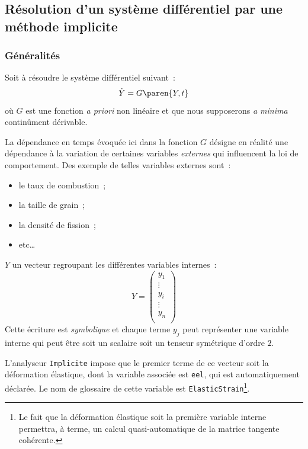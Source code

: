 \documentclass[rectoverso,pleiades,pstricks,leqno,anti]{texmf/note_technique_2010}
\begin{document}
\subsection{Résolution d'un système différentiel par une méthode implicite}
\label{sec:resol-dun-syst-implicite}

\subsubsection{Généralités} Soit à résoudre le système différentiel
suivant~:
\begin{equation}
  \label{eq:systeme_diff-implicite}
  \dot{Y}=G\paren{Y,t}
\end{equation}
où \(G\) est une fonction {\em a priori} non linéaire et que nous
supposerons {\em a minima} continûment dérivable.

La dépendance en temps évoquée ici dans la fonction \(G\) désigne en
réalité une dépendance à la variation de certaines variables {\em
  externes} qui influencent la loi de comportement. Des exemple de
telles variables externes sont~:
\begin{minipage}[t]{0.5\linewidth}
  \begin{itemize}
    \item le taux de combustion~;
    \item la taille de grain~;
    \item la densité de fission~;
    \item etc\ldots
  \end{itemize}
\end{minipage}

\(Y\) un vecteur regroupant les différentes variables internes~:
\[
Y=
\begin{pmatrix}
  y_{1} \\
  \vdots \\
  y_{i} \\
  \vdots \\
  y_{n} \\
\end{pmatrix}
\]
Cette écriture est {\em symbolique} et chaque terme \(y_{j}\) peut
représenter une variable interne qui peut être soit un scalaire soit un
tenseur symétrique d'ordre \(2\).

L'analyseur \texttt{Implicite} impose que le premier terme de ce vecteur
soit la déformation élastique, dont la variable associée est
\texttt{eel}, qui est automatiquement déclarée. Le nom de glossaire de
cette variable est \texttt{Elastic\-Strain}\footnote{Le fait que la
  déformation élastique soit la première variable interne permettra, à
  terme, un calcul quasi-automatique de la matrice tangente cohérente.}.
\end{document}
